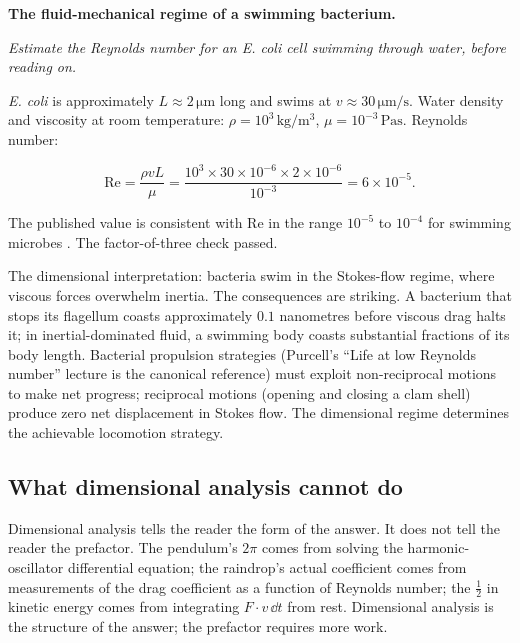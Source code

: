 \begin{estimation}
\textbf{The fluid-mechanical regime of a swimming bacterium.}

\smallskip
\textit{Estimate the Reynolds number for an \emph{E. coli} cell
swimming through water, before reading on.}

\smallskip
\emph{E. coli} is approximately $L \approx 2 \,\si{\micro\meter}$
long and swims at $v \approx 30 \,\si{\micro\meter\per\second}$.
Water density and viscosity at room temperature: $\rho = 10^{3}
\,\si{\kilogram\per\meter\cubed}$, $\mu = 10^{-3} \,\si{\pascal
\second}$. Reynolds number:

\[
\mathrm{Re} = \frac{\rho v L}{\mu} = \frac{10^{3} \times 30 \times
10^{-6} \times 2 \times 10^{-6}}{10^{-3}} = 6 \times 10^{-5}.
\]

The published value is consistent with $\mathrm{Re}$ in the range
$10^{-5}$ to $10^{-4}$ for swimming microbes \cite{paper:purcell-1977}.
The factor-of-three check passed.

The dimensional interpretation: bacteria swim in the Stokes-flow
regime, where viscous forces overwhelm inertia. The consequences are
striking. A bacterium that stops its flagellum coasts approximately
$0.1$ nanometres before viscous drag halts it; in inertial-dominated
fluid, a swimming body coasts substantial fractions of its body
length. Bacterial propulsion strategies (Purcell's ``Life at low
Reynolds number'' lecture is the canonical reference) must exploit
non-reciprocal motions to make net progress; reciprocal motions
(opening and closing a clam shell) produce zero net displacement in
Stokes flow. The dimensional regime determines the achievable
locomotion strategy.
\end{estimation}

\subsection{What dimensional analysis cannot do}

Dimensional analysis tells the reader the form of the answer. It does
not tell the reader the prefactor. The pendulum's $2\pi$ comes from
solving the harmonic-oscillator differential equation; the
raindrop's actual coefficient comes from measurements of the drag
coefficient as a function of Reynolds number; the $\tfrac{1}{2}$ in
kinetic energy comes from integrating $F \cdot v \,\dd t$ from rest.
Dimensional analysis is the structure of the answer; the prefactor
requires more work.

